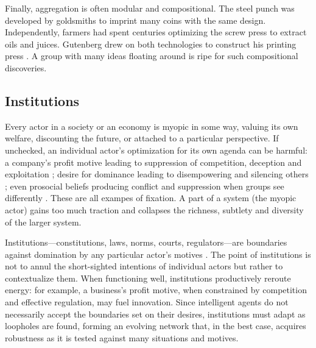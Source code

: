\documentclass[11pt]{article}
\begin{document}
Finally, aggregation is often modular and compositional. The steel punch was developed by goldsmiths to imprint many coins with the same design. Independently, farmers had spent centuries optimizing the screw press to extract oils and juices. Gutenberg drew on both technologies to construct his printing press \citep{johnson2010where}. A group with many ideas floating around is ripe for such compositional discoveries.










\subsection{Institutions} 

Every actor in a society or an economy is myopic in some way, valuing its own welfare, discounting the future, or attached to a particular perspective. If unchecked, an individual actor's optimization for its own agenda can be harmful: a company's profit motive leading to suppression of competition, deception and exploitation \citep{bakan2006corporation}; desire for dominance leading to disempowering and silencing others \citep{sidanius2001social}; even prosocial beliefs producing conflict and suppression when groups see differently \citep{haidt2012righteous}. These are all exampes of fixation. A part of a system (the myopic actor) gains too much traction and collapses the richness, subtlety and diversity of the larger system.

Institutions---constitutions, laws, norms, courts, regulators---are boundaries against domination by any particular actor's motives \citep{north1990institutions, ostrom1990governing, leibo2025societal}. The point of institutions is not to annul the short-sighted intentions of individual actors but rather to contextualize them. When functioning well, institutions productively reroute energy: for example, a business's profit motive, when constrained by competition and effective regulation, may fuel innovation. Since intelligent agents do not necessarily accept the boundaries set on their desires, institutions must adapt as loopholes are found, forming an evolving network that, in the best case, acquires robustness as it is tested against many situations and motives.
\end{document}
